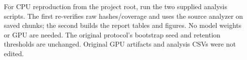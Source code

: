 \documentclass[11pt,a4paper]{article}
\begin{document}
For CPU reproduction from the project root, run the two supplied analysis scripts. The first re-verifies raw hashes/coverage and uses the source analyzer on saved chunks; the second builds the report tables and figures. No model weights or GPU are needed. The original protocol's bootstrap seed and retention thresholds are unchanged. Original GPU artifacts and analysis CSVs were not edited.
\end{document}
